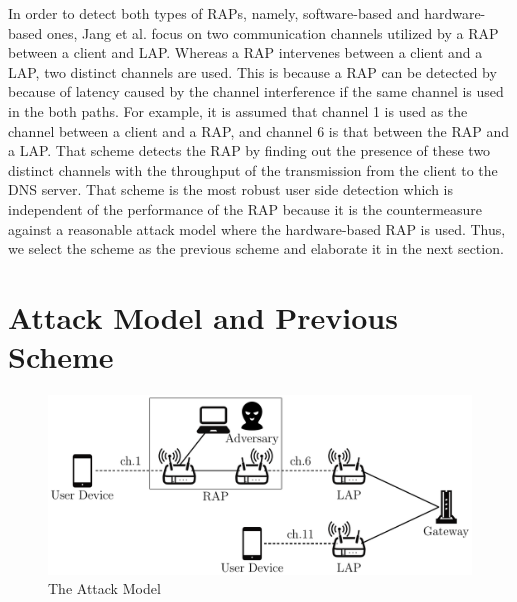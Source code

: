 \documentclass[paper]{ieice}
\begin{document}
In order to detect both types of RAPs, namely, software-based and hardware-based ones, Jang et al. focus on two communication channels utilized by a RAP between a client and LAP\cite{previous}.
Whereas a RAP intervenes between a client and a LAP, two distinct channels are used.
This is because a RAP can be detected by \cite{rtt} because of latency caused by the channel interference if the same channel is used in the both paths.
For example, it is assumed that channel 1 is used as the channel between a client and a RAP, and channel 6 is that between the RAP and a LAP.
That scheme detects the RAP by finding out the presence of these two distinct channels with the throughput of the transmission from the client to the DNS server.
That scheme is the most robust user side detection which is independent of the performance of the RAP because it is the countermeasure against a reasonable attack model where the hardware-based RAP is used.
Thus, we select the scheme \cite{previous} as the previous scheme and elaborate it in the next section.

\section{Attack Model and Previous Scheme}\label{sec:3}
\begin{figure}[t]
    \begin{center}
        \includegraphics[scale=0.48]{attack-model/attack-model.pdf}
        \caption{The Attack Model}
        \label{fig:model}
    \end{center}
\vspace{-2zh}
\end{figure}
\end{document}
